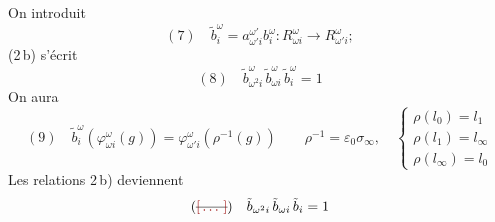 \documentclass[11pt,a4paper]{article}
\begin{document}
On introduit
\[
(7)\quad \tilde b_i^{\omega} = a^{\omega'}_{\omega' i} b_i^{\omega} : R^{\omega}_{\omega i} \to R^{\omega}_{\omega' i} ;
\]
(2\,b) s'écrit
\[
(8)\quad \tilde b^{\omega}_{\omega^2 i}\, \tilde b^{\omega}_{\omega i}\, \tilde b_i^{\omega} = 1
\]
On aura
\[
(9)\quad \tilde b_i^{\omega}(\varphi^{\omega}_{\omega i}(g)) = \varphi^{\omega}_{\omega' i}(\rho^{-1}(g))
\qquad \rho^{-1} = \varepsilon_0 \sigma_\infty,
\quad
\begin{cases}
\rho(l_0) = l_1 \\
\rho(l_1) = l_\infty \\
\rho(l_\infty) = l_0
\end{cases}
\]
Les relations 2\,b) deviennent
\[
(\text{\struck{\ill{}}})\quad \tilde b_{\omega^2 i}\, \tilde b_{\omega i}\, \tilde b_i = 1
\]
\end{document}
